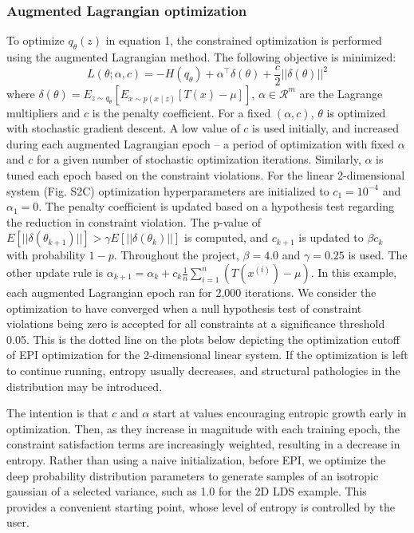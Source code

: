 \documentclass[11pt]{article}
\begin{document}
\subsubsection{Augmented Lagrangian optimization}\label{methods_AL_opt}
To optimize $q_\theta(z)$ in equation 1, the constrained optimization is performed using the augmented Lagrangian method.  The following objective is minimized:
\begin{equation}
L(\theta; \alpha, c) = -H(q_\theta) + \alpha^\top \delta(\theta) + \frac{c}{2}||\delta(\theta)||^2
\end{equation}
where $\delta(\theta) = E_{z \sim q_\theta}\left[ E_{x\sim p(x \mid z)}\left[T(x) - \mu \right] \right]$, $\alpha \in \mathcal{R}^m$ are the Lagrange multipliers and $c$ is the penalty coefficient.  For a fixed $(\alpha, c)$, $\theta$ is optimized with stochastic gradient descent.  A low value of $c$ is used initially, and increased during each augmented Lagrangian epoch -- a period of optimization with fixed $\alpha$ and $c$ for a given number of stochastic optimization iterations. Similarly, $\alpha$ is tuned each epoch based on the constraint violations.  For the linear 2-dimensional system (Fig. S2C) optimization hyperparameters are initialized to $c_1 = 10^{-4}$ and $\alpha_1 = 0$.  The penalty coefficient is updated based on a hypothesis test regarding the reduction in constraint violation.  The p-value of $E[||\delta(\theta_{k+1})||] > \gamma E[||\delta(\theta_{k})||]$ is computed, and $c_{k+1}$ is updated  to $\beta c_k$ with probability $1-p$.  Throughout the project, $\beta = 4.0$ and $\gamma = 0.25$ is used.  The other update rule is $\alpha_{k+1} = \alpha_k + c_k \frac{1}{n} \sum_{i=1}^n (T(x^{(i)}) - \mu)$.  In this example, each augmented Lagrangian epoch ran for 2,000 iterations.  We consider the optimization to have converged when a null hypothesis test of constraint violations being zero is accepted for all constraints at a significance threshold 0.05.  This is the dotted line on the plots below depicting the optimization cutoff of EPI optimization for the 2-dimensional linear system.  If the optimization is left to continue running, entropy usually decreases, and structural pathologies in the distribution may be introduced.

The intention is that $c$ and $\alpha$ start at values encouraging entropic growth early in optimization.  Then, as they increase in magnitude with each training epoch, the constraint satisfaction terms are increasingly weighted, resulting in a decrease in entropy.  Rather than using a naive initialization, before EPI, we optimize the deep probability distribution parameters to generate samples of an isotropic gaussian of a selected variance, such as 1.0 for the 2D LDS example.  This provides a convenient starting point, whose level of entropy is controlled by the user.
\end{document}
